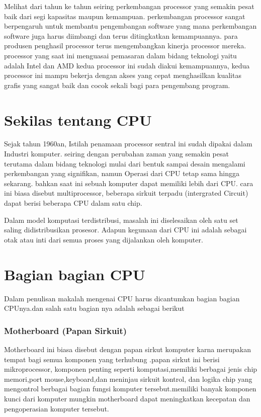 			

 	Melihat dari tahun ke tahun seiring perkembangan processor yang semakin pesat baik dari segi kapasitas maupun kemampuan. perkembangan processor sangat berpengaruh untuk membantu pengembangan software yang mana perkembangan software juga harus diimbangi dan terus ditingkatkan kemampuannya. para produsen penghasil processor terus mengembangkan kinerja processor mereka. processor yang saat ini menguasai pemasaran dalam bidang teknologi yaitu adalah Intel dan AMD kedua processor ini sudah diakui kemampuannya, kedua processor ini mampu bekerja dengan akses yang cepat menghasilkan kualitas grafis yang sangat baik dan cocok sekali bagi para pengembang program.\cite{irwansyah2014pengantar} 




 	\section{Sekilas tentang CPU}
 	Sejak tahun 1960an, Istilah penamaan processor sentral ini sudah dipakai dalam Industri komputer. seiring dengan perubahan zaman yang semakin pesat terutama dalam bidang teknologi mulai dari bentuk sampai desain mengalami perkembangan yang signifikan, namun Operasi dari CPU tetap sama hingga sekarang. bahkan saat ini sebuah komputer dapat memiliki lebih dari CPU. cara ini biasa disebut multiprocessor, beberapa sirkuit terpadu (intergrated Circuit) dapat berisi beberapa CPU dalam satu chip.
 
 	Dalam model komputasi terdistribusi, masalah ini diselesaikan oleh satu set saling didistribusikan prosesor. Adapun kegunaan dari CPU ini adalah sebagai otak atau inti dari semua proses yang dijalankan oleh komputer.



 	\section{Bagian bagian CPU}
 	Dalam penulisan makalah mengenai CPU harus dicantumkan bagian bagian CPUnya.dan salah satu bagian nya adalah sebagai berikut
 			\subsubsection{Motherboard (Papan Sirkuit)}
 		Motherboard ini biasa disebut dengan papan sirkut komputer karna merupakan tempat bagi semua komponen yang terhubung .papan sirkut ini berisi mikroprocessor, komponen penting seperti komputasi,memiliki berbagai jenis chip memori,port mouse,keyboard,dan meninjau sirkuit kontrol, dan logika chip yang mengontrol berbagai bagian fungsi komputer tersebut.memiliki banyak komponen kunci dari komputer mungkin motherboard dapat meningkatkan kecepatan dan pengoperasian komputer tersebut.



